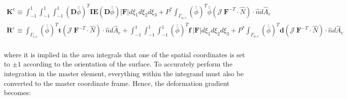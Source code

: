 \documentclass[10pt]{article}
\begin{document}
\begin{equation}
\label{eq:FEWeakForm_element}
\begin{aligned}
\textbf{K}^e\equiv\int_{-1}^{1}\int_{-1}^{1}\int_{-1}^{1}(\textbf{D}\bar{\bar{\phi}})^T\textbf{IE}(\textbf{D}\bar{\bar{\phi}})|\textbf{F}|d\xi_1d\xi_2d\xi_3 +P^{*}\int_{\Gamma_{u,e}}(\bar{\bar{\phi}})^T\bar{\bar{\phi}}(\mathscr{J}\ \textbf{F}^{-T}\cdot\hat{N})\cdot\hat{n}d\hat{A}_e\\
\textbf{R}^e\equiv\int_{\Gamma_{t,e}}(\bar{\bar{\phi}})^T\textbf{t}(\mathscr{J}\ \textbf{F}^{-T}\cdot\hat{N})\cdot\hat{n}d\hat{A}_e+\int_{-1}^{1}\int_{-1}^{1}\int_{-1}^{1}(\bar{\bar{\phi}})^T\textbf{f}\ |\textbf{F}|d\xi_1d\xi_2d\xi_3+P^{*}\int_{\Gamma_{u,e}}(\bar{\bar{\phi}})^T\textbf{d}(\mathscr{J}\ \textbf{F}^{-T}\cdot\hat{N})\cdot\hat{n}d\hat{A}_e\\
\end{aligned}
\end{equation}

where it is implied in the area integrals that one of the spatial coordinates is set to \(\pm 1\) according to the orientation of the surface. To accurately perform the integration in the master element, everything within the integrand must also be converted to the master coordinate frame. Hence, the deformation gradient becomes:
\end{document}
